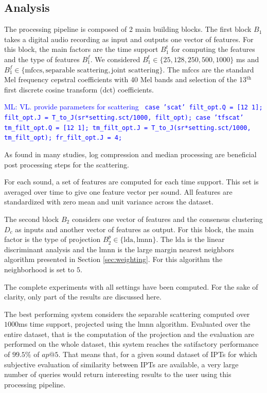 \documentclass{bmcart}
\newcommand{\ipts}{IPTs\xspace}
\newcommand{\ml}[1]{\textcolor{blue}{ML: #1}}
\begin{document}
\subsection*{Analysis}

The processing pipeline is composed of 2 main building blocks. The first block $B_1$ takes a digital audio recording as input and outputs one vector of features. For this block, the main factors are the time support $B_1^t$ for computing the features and the type of features $B_1^f$. We considered $B_1^t \in \{ 25, 128, 250, 500, 1000 \}$ ms and $B_1^f \in \{ \text{mfccs}, \text{separable scattering}, \text{joint scattering} \}$. The mfccs are the standard Mel frequency cepstral coefficients with 40 Mel bands and selection of the 13$^\text{th}$ first discrete cosine transform (dct) coefficients.

\ml{VL. provide parameters for scattering
\texttt{
case 'scat'
    filt\_opt.Q = [12 1];
    filt\_opt.J = T\_to\_J(sr*setting.sct/1000, filt\_opt);
case 'tfscat'
    tm\_filt\_opt.Q = [12 1];
    tm\_filt\_opt.J = T\_to\_J(sr*setting.sct/1000, tm\_filt\_opt);
    fr\_filt\_opt.J = 4;}}

As found in many studies, log compression and median processing are beneficial post processing steps for the scattering.

For each sound, a set of features are computed for each time support. This set is averaged over time to give one feature vector per sound.
All features are standardized with zero mean and unit variance across the dataset.

The second block $B_2$ considers one vector of features and the consensus clustering $D_c$ as inputs and another vector of features as output. For this block, the main factor is the type of projection $B_2^p \in \{ \text{lda}, \text{lmnn} \}$. The lda is the linear discriminant analysis \cite{} and the lmnn is the large margin nearest neighbors algorithm presented in Section \ref{sec:weighting}. For this algorithm the neighborhood is set to $5$.

The complete experiments with all settings have been computed. For the sake of clarity, only part of the results are discussed here.

The best performing system considers the separable scattering computed over $1000$ms time support, projected using the lmnn algorithm. Evaluated over the entire dataset, that is the computation of the projection and the evaluation are performed on the whole dataset, this system reaches the satifactory performance of $99.5\%$ of $ap@5$. That means that, for a given sound dataset of \ipts for which subjective evaluation of similarity between \ipts are available, a very large number of queries would return interesting results to the user using this processing pipeline.
\end{document}
